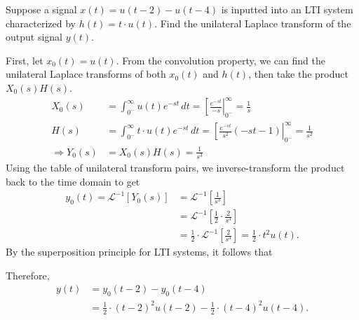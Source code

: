 \documentclass{report}
\begin{document}
\begin{example}
    Suppose a signal $x(t)= u(t-2)-u(t-4)$ is inputted into an LTI system characterized by $h(t)=t\cdot u(t)$. Find the unilateral Laplace transform of 
    the output signal $y(t)$.
\end{example}
\begin{solution}
    First, let $x_0(t) = u(t)$. From the convolution property, we can find the unilateral Laplace transforms of both $x_0(t)$ and $h(t)$, then take the product $X_0(s)H(s)$. 
    \begin{align*}
        X_0(s) &= \int_{0^-}^{\infty} u(t)e^{-st} \,dt = \left[\frac{e^{-st}}{-s}\right|_{0^-}^{\infty} = \frac{1}{s} \\
        H(s) &=\int_{0^-}^{\infty} t\cdot u(t)e^{-st} \,dt = \left[\frac{e^{-st}}{s^2}(-st-1)\right|_{0^-}^{\infty} = \frac{1}{s^2} \\
        \Longrightarrow Y_0(s) &= X_0(s)H(s) = \frac{1}{s^3}
    \end{align*}
    Using the table of unilateral transform pairs, we inverse-transform the product back to the time domain to get 
    \begin{align*}
        y_0(t) = \mathcal{L}^{-1}[Y_0(s)] &= \mathcal{L}^{-1}\left[\frac{1}{s^3}\right] \\
        &= \mathcal{L}^{-1}\left[\frac{1}{2}\cdot\frac{2}{s^3}\right] \\
        &= \frac{1}{2}\cdot\mathcal{L}^{-1}\left[\frac{2}{s^3}\right] = \frac{1}{2}\cdot t^2u(t).
    \end{align*}
    By the superposition principle for LTI systems, it follows that 
    \begin{center}
    \end{center}
    Therefore, 
    \begin{align*}
        y(t) &= y_0(t-2)-y_0(t-4) \\
        &= \frac{1}{2}\cdot (t-2)^2u(t-2) - \frac{1}{2}\cdot (t-4)^2u(t-4).
    \end{align*}
\end{solution}
\end{document}
